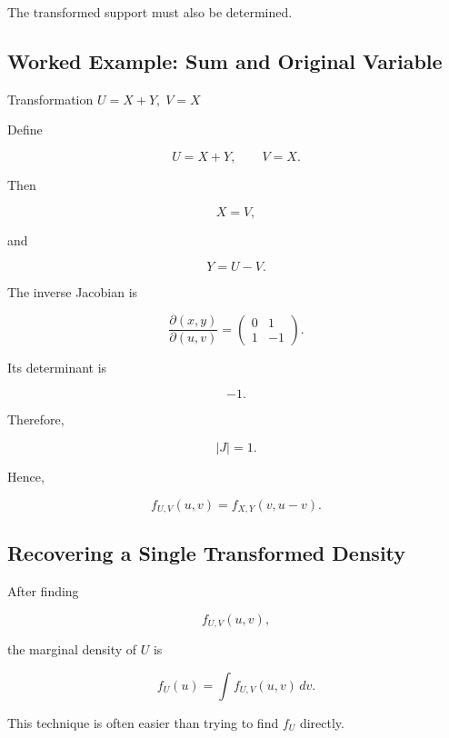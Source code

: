 The transformed support must also be determined.

\subsection{Worked Example: Sum and Original Variable}
\label{subsec:worked-jacobian-sum}

\begin{workedexamplebox}{Transformation \(U=X+Y,\;V=X\)}

Define

\[
U=X+Y,
\qquad
V=X.
\]

Then

\[
X=V,
\]

and

\[
Y=U-V.
\]

The inverse Jacobian is

\[
\frac{\partial(x,y)}{\partial(u,v)}
=
\begin{pmatrix}
0&1\\
1&-1
\end{pmatrix}.
\]

Its determinant is

\[
-1.
\]

Therefore,

\[
|J|=1.
\]

Hence,

\begin{answerbox}
\[
\boxed{
f_{U,V}(u,v)
=
f_{X,Y}(v,u-v).
}
\]
\end{answerbox}

\end{workedexamplebox}

\subsection{Recovering a Single Transformed Density}
\label{subsec:marginalizing-transformed-density}

After finding

\[
f_{U,V}(u,v),
\]

the marginal density of \(U\) is

\[
\boxed{
f_U(u)
=
\int
f_{U,V}(u,v)\,dv.
}
\]

This technique is often easier than trying to find \(f_U\) directly.

